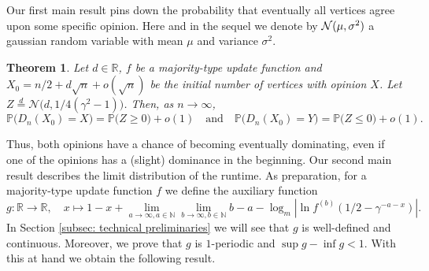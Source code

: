 \documentclass[11pt]{article}
\newcommand{\Prob}{\mathbb{P}}
\newtheorem{theorem}{Theorem}
\numberwithin{theorem}{section}
\begin{document}
Our first main result pins down the probability that eventually all vertices agree upon some specific opinion. Here and in the sequel we denote by ${\cal N}(\mu, \sigma^2)$ a gaussian random variable with mean $\mu$ and variance $\sigma^2$.
\begin{theorem}\label{thm: X wins}
Let $d\in\mathbb{R}$, $f$ be a majority-type update function and  $X_0=n/2 + d\sqrt{n}+o(\sqrt{n})$ be the initial number of vertices with opinion $X$. Let $Z \stackrel{d}{=} \mathcal{N}\big(d,1/4(\gamma^2-1)\big)$. Then, as $n\to \infty$,
\[
    \Prob\big(D_n(X_0) = X\big) = \Prob\big(Z \geq 0\big)+o(1)
    \quad
    \text{and}
    \quad
    \Prob\big(D_n(X_0) = Y\big) = \Prob\big(Z \leq 0\big)+o(1).
\]
\end{theorem}
Thus, both opinions have a chance of becoming eventually dominating, even if one of the opinions has a (slight) dominance in the beginning. Our second main result describes the limit distribution of the runtime. As preparation, for a majority-type update function $f$ we define the auxiliary function
\[
    g:\mathbb{R}\to \mathbb{R},
    \quad 
    x \mapsto 1-x+\lim_{a\to \infty, a\in\mathbb{N}} \lim_{b \to \infty, b\in \mathbb{N}} b-a- \log_m|\ln f^{(b)}(1/2-\gamma^{-a-x})|.
\]
In Section \ref{subsec: technical preliminaries}
we will see that $g$ is well-defined and continuous. Moreover, we prove that $g$ is $1$-periodic and $\sup g-\inf g < 1$. 
With this at hand we obtain the following result.
\end{document}
